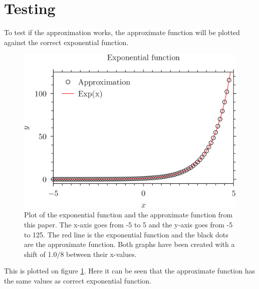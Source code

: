 \documentclass[twocolumn,a4paper]{article}
\begin{document}
\section{Testing}
To test if the approximation works, the approximate function will be plotted
against the correct exponential function.
\begin{figure}[b]
\includegraphics{exp.pyxplot.png}
\caption{Plot of the exponential function and the approximate function from this paper. The x-axis goes from -5 to 5
and the y-axis goes from -5 to 125. The red line is the exponential function and the black dots are the approximate
function. Both graphs have been created with a shift of 1.0/8 between their x-values.}
\label{fig: plot}
\end{figure}
This is plotted on figure \ref{fig: plot}. Here it can be seen that the approximate function has the same values as
correct exponential function.
\end{document}

